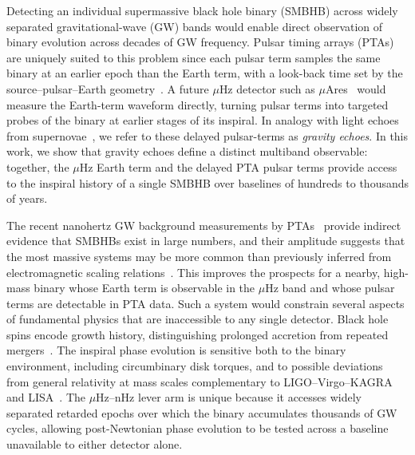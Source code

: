\documentclass[aps,prx,twocolumn,superscriptaddress,nofootinbib,longbibliography]{revtex4-2}
\begin{document}
Detecting an individual supermassive black hole binary (SMBHB) across widely separated gravitational-wave (GW) bands would enable direct observation of binary evolution across decades of GW frequency. Pulsar timing arrays (PTAs) are uniquely suited to this problem since each pulsar term samples the same binary at an earlier epoch than the Earth term, with a look-back time set by the source--pulsar--Earth geometry~\cite{Lee2011,CorbinCornish2010,Mingarelli2012}. A future $\mu$Hz detector such as $\mu$Ares~\cite{Sesana2021} would measure the Earth-term waveform directly, turning pulsar terms into targeted probes of the binary at earlier stages of its inspiral. In analogy with light echoes from supernovae~\cite{Couderc1939, Zwicky1940}, we refer to these delayed pulsar-terms as \emph{gravity echoes}. In this work, we show that gravity echoes define a distinct multiband observable: together, the $\mu$Hz Earth term and the delayed PTA pulsar terms provide access to the inspiral history of a single SMBHB over baselines of hundreds to thousands of years.

The recent nanohertz GW background measurements by PTAs~\cite{NANOGrav15yr,EPTA2023,PPTA2023,CPTA2023,MPTA2025} provide indirect evidence that SMBHBs exist in large numbers, and their amplitude suggests that the most massive systems may be more common than previously inferred from electromagnetic scaling relations~\cite{Agazie2023pop}. This improves the prospects for a nearby, high-mass binary whose Earth term is observable in the $\mu$Hz band and whose pulsar terms are detectable in PTA data. Such a system would constrain several aspects of fundamental physics that are inaccessible to any single detector. Black hole spins encode growth history, distinguishing prolonged accretion from repeated mergers~\cite{Barausse2012,Hughes2003,Berti2008}. The inspiral phase evolution is sensitive both to the binary environment, including circumbinary disk torques, and to possible deviations from general relativity at mass scales complementary to LIGO--Virgo--KAGRA~\cite{LIGOScientific2021} and LISA~\cite{LISA2017}. The $\mu$Hz--nHz lever arm is unique because it accesses widely separated retarded epochs over which the binary accumulates thousands of GW cycles, allowing post-Newtonian phase evolution to be tested across a baseline unavailable to either detector alone.
\end{document}
